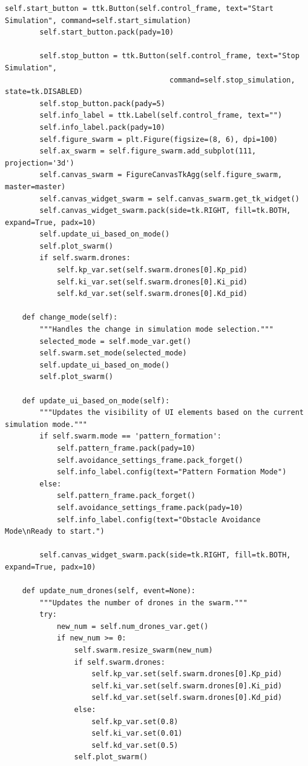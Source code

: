 \documentclass[11pt]{article}
\begin{document}
\begin{lstlisting}[style=pythonstyle]
        self.start_button = ttk.Button(self.control_frame, text="Start Simulation", command=self.start_simulation)
        self.start_button.pack(pady=10)

        self.stop_button = ttk.Button(self.control_frame, text="Stop Simulation",
                                      command=self.stop_simulation, state=tk.DISABLED)
        self.stop_button.pack(pady=5)
        self.info_label = ttk.Label(self.control_frame, text="")
        self.info_label.pack(pady=10)
        self.figure_swarm = plt.Figure(figsize=(8, 6), dpi=100)
        self.ax_swarm = self.figure_swarm.add_subplot(111, projection='3d')
        self.canvas_swarm = FigureCanvasTkAgg(self.figure_swarm, master=master)
        self.canvas_widget_swarm = self.canvas_swarm.get_tk_widget()
        self.canvas_widget_swarm.pack(side=tk.RIGHT, fill=tk.BOTH, expand=True, padx=10)
        self.update_ui_based_on_mode()
        self.plot_swarm()
        if self.swarm.drones:
            self.kp_var.set(self.swarm.drones[0].Kp_pid)
            self.ki_var.set(self.swarm.drones[0].Ki_pid)
            self.kd_var.set(self.swarm.drones[0].Kd_pid)

    def change_mode(self):
        """Handles the change in simulation mode selection."""
        selected_mode = self.mode_var.get()
        self.swarm.set_mode(selected_mode)
        self.update_ui_based_on_mode()
        self.plot_swarm()

    def update_ui_based_on_mode(self):
        """Updates the visibility of UI elements based on the current simulation mode."""
        if self.swarm.mode == 'pattern_formation':
            self.pattern_frame.pack(pady=10)
            self.avoidance_settings_frame.pack_forget()
            self.info_label.config(text="Pattern Formation Mode")
        else:
            self.pattern_frame.pack_forget()
            self.avoidance_settings_frame.pack(pady=10)
            self.info_label.config(text="Obstacle Avoidance Mode\nReady to start.")

        self.canvas_widget_swarm.pack(side=tk.RIGHT, fill=tk.BOTH, expand=True, padx=10)

    def update_num_drones(self, event=None):
        """Updates the number of drones in the swarm."""
        try:
            new_num = self.num_drones_var.get()
            if new_num >= 0:
                self.swarm.resize_swarm(new_num)
                if self.swarm.drones:
                    self.kp_var.set(self.swarm.drones[0].Kp_pid)
                    self.ki_var.set(self.swarm.drones[0].Ki_pid)
                    self.kd_var.set(self.swarm.drones[0].Kd_pid)
                else:
                    self.kp_var.set(0.8)
                    self.ki_var.set(0.01)
                    self.kd_var.set(0.5)
                self.plot_swarm()


\end{lstlisting}
\end{document}
